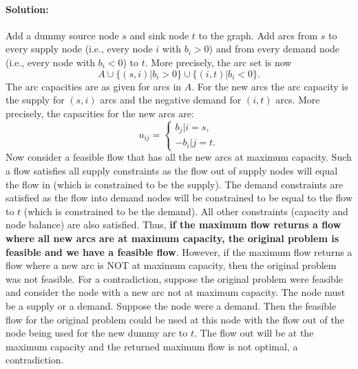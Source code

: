 \documentclass[10pt]{article}
\begin{document}
\begin{enumerate}
    \paragraph{Solution:} Add a dummy source node $s$ and sink node
    $t$ to the graph.  Add arcs from $s$ to every supply node (i.e.,
    every node $i$ with $b_i > 0$) and from every demand node (i.e.,
    every node with $b_i < 0$) to $t$.  More precisely, the arc set is
    now
    \[
    A \cup \{(s,i) | b_i > 0\} \cup \{(i,t) | b_i < 0\}.
    \]
    The arc capacities are as given for arcs in $A$. For the new arcs
    the arc capacity is the supply for $(s,i)$ arcs and the negative
    demand for $(i,t)$ arcs. More precisely, the capacities for the
    new arcs are:
    \[
    u_{ij} = \left\{
      \begin{array}{ll}
        b_j | i=s, \\
        -b_i | j=t.
      \end{array}
      \right.
    \]
    Now consider a feasible flow that has all the new arcs at maximum capacity.
    Such a flow satisfies all supply constraints as the flow out of supply nodes will
    equal the flow in (which is constrained to be the supply). The
    demand constraints are satisfied as the
    flow into demand nodes will be constrained to be equal to the flow
    to $t$ (which is constrained to be the demand). All other
    constraints (capacity and node balance) are also satisfied. Thus,
    {\bf if the maximum flow returns a flow where all new arcs are at
      maximum capacity, the original problem is feasible and we have a
      feasible flow}. However, if the maximum flow returns a flow
    where a new arc is NOT at maximum capacity, then the original
    problem was not feasible.  For a contradiction, suppose the
    original problem were feasible and consider the node
    with a new arc not at maximum capacity. The node must be a supply
    or a demand. Suppose the node were a demand. Then the feasible flow for the
    original problem could be used at this node with the flow out of
    the node being used for the new dummy arc to $t$. The flow out
    will be at the maximum capacity and the returned maximum flow is
    not optimal, a contradiction.
\end{enumerate}
  
\end{document}
